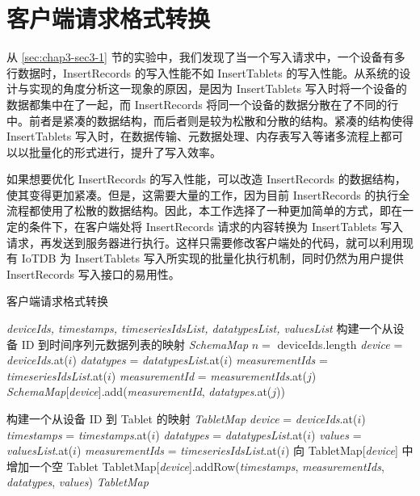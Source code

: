 \section{客户端请求格式转换}
从 \ref{sec:chap3-sec3-1} 节的实验中，我们发现了当一个写入请求中，一个设备有多行数据时，InsertRecords 的写入性能不如 InsertTablets 的写入性能。从系统的设计与实现的角度分析这一现象的原因，是因为 InsertTablets 写入时将一个设备的数据都集中在了一起，而 InsertRecords 将同一个设备的数据分散在了不同的行中。前者是紧凑的数据结构，而后者则是较为松散和分散的结构。紧凑的结构使得 InsertTablets 写入时，在数据传输、元数据处理、内存表写入等诸多流程上都可以以批量化的形式进行，提升了写入效率。

如果想要优化 InsertRecords 的写入性能，可以改造 InsertRecords 的数据结构，使其变得更加紧凑。但是，这需要大量的工作，因为目前 InsertRecords 的执行全流程都使用了松散的数据结构。因此，本工作选择了一种更加简单的方式，即在一定的条件下，在客户端处将 InsertRecords 请求的内容转换为 InsertTablets 写入请求，再发送到服务器进行执行。这样只需要修改客户端处的代码，就可以利用现有 IoTDB 为 InsertTablets 写入所实现的批量化执行机制，同时仍然为用户提供 InsertRecords 写入接口的易用性。

\begin{algorithm}
  \caption{客户端请求格式转换}
  \label{alg:client-req-convert}
  \small
  \begin{algorithmic}
    \REQUIRE \emph{deviceIds, timestamps, timeseriesIdsList, datatypesList, valuesList}
    \STATE 构建一个从设备 ID 到时间序列元数据列表的映射 \emph{SchemaMap}
    \STATE $n = $ deviceIds.length
      \STATE \emph{device} =  \emph{deviceIds}.at($i$)
      \STATE \emph{datatypes} = \emph{datatypesList}.at($i$)
      \STATE \emph{measurementIds} = \emph{timeseriesIdsList}.at($i$)
        \STATE \emph{measurementId} = \emph{measurementIds}.at($j$)
          \STATE \emph{SchemaMap}[\emph{device}].add(\emph{measurementId}, \emph{datatypes}.at($j$))
        \ENDIF
      \ENDFOR
    \ENDFOR

    \STATE 构建一个从设备 ID 到 Tablet 的映射 \emph{TabletMap}
      \STATE \emph{device} =  \emph{deviceIds}.at($i$)
      \STATE \emph{timestamps} = \emph{timestamps}.at($i$)
      \STATE \emph{datatypes} = \emph{datatypesList}.at($i$)
      \STATE \emph{values} = \emph{valuesList}.at($i$)
      \STATE \emph{measurementIds} = \emph{timeseriesIdsList}.at($i$)
        \STATE 向 TabletMap[\emph{device}] 中增加一个空 Tablet
      \ENDIF 
      \STATE TabletMap[\emph{device}].addRow(\emph{timestamps}, \emph{measurementIds}, \emph{datatypes}, \emph{values})
    \ENDFOR
    \RETURN \emph{TabletMap}
  \end{algorithmic}
\end{algorithm}

